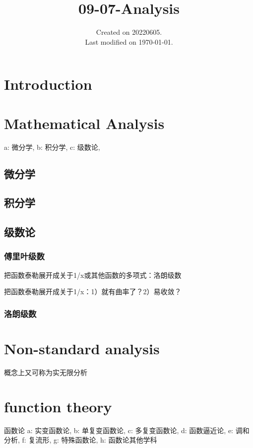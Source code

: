 \documentclass[UTF8]{../09-Mathematics}
\begin{document}
\title{09-07-Analysis}
\date{Created on 20220605.\\   Last modified on \today.}
\maketitle
\tableofcontents


\chapter{Introduction}




\chapter{Mathematical Analysis}
a: 微分学, 
b: 积分学, 
c: 级数论,

\section{微分学}
\section{积分学}
\section{级数论}
\subsection{傅里叶级数}

把函数泰勒展开成关于1/x或其他函数的多项式：洛朗级数

把函数泰勒展开成关于1/x：1）就有曲率了？2）易收敛？

\subsection{洛朗级数}



\chapter{Non-standard analysis}

概念上又可称为实无限分析



\chapter{function theory}
函数论
a: 实变函数论, 
b: 单复变函数论, 
c: 多复变函数论, 
d: 函数逼近论, 
e: 调和分析, 
f: 复流形, 
g: 特殊函数论, 
h: 函数论其他学科
\end{document}
